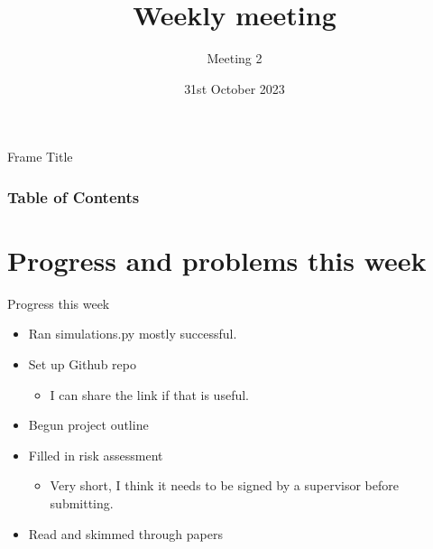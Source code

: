 \documentclass{beamer}
\title{Weekly meeting}
\subtitle{Meeting 2}
\date{31st October 2023}
\begin{document}
\frame{\titlepage}

\begin{frame}{Frame Title}
\frametitle{Table of Contents}
\tableofcontents
\end{frame}


\section{Progress and problems this week}
\begin{frame}{Progress this week}
    \begin{itemize}
        \item Ran simulations.py mostly successful.
        \item Set up Github repo
            \begin{itemize}
                \item I can share the link if that is useful.
            \end{itemize}
        \item Begun project outline
        \item Filled in risk assessment
            \begin{itemize}
                \item Very short, I think it needs to be signed by a supervisor before submitting. 
            \end{itemize}
        \item Read and skimmed through papers
    \end{itemize}
\end{frame}
\end{document}
